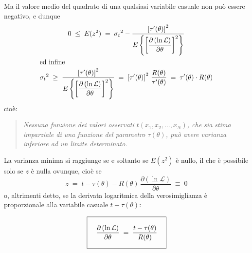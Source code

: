 Ma il valore medio del quadrato di una qualsiasi variabile
casuale non pu\`o essere negativo, e dunque
\begin{gather*}
  0 \; \le \;
    E(z^2) \; = \;
    {\sigma_t}^2 -
    \frac{ \left[ \tau ' (\theta) \right] ^2 }
    {E \left\{ \left[ \dfrac{\partial \left( \ln
    \mathcal{L} \right)}{\partial \theta} \right]
    ^2 \right\} } \\
  \intertext{ed infine}
  {\sigma_t}^2 \; \geq \;
    \frac{ \left[ \tau ' (\theta) \right] ^2 }
    {E \left\{ \left[ \dfrac{\partial \left( \ln
    \mathcal{L} \right)}{\partial \theta} \right]
    ^2 \right\} }
    \; = \; \left[ \tau ' (\theta) \right] ^2 \,
    \frac{R(\theta)}{\tau ' (\theta)}
    \; = \; \tau ' (\theta) \cdot R(\theta)
\end{gather*}
cio\`e:
\begin{quote}
  \textit{Nessuna funzione dei valori osservati
    $t(x_1,x_2,\ldots,x_N)$, che sia stima imparziale di una
    funzione del parametro $\tau(\theta)$, pu\`o avere
    varianza inferiore ad un limite determinato.}
\end{quote}

La varianza minima si raggiunge se e soltanto se $E(z^2)$
\`e nullo, il che \`e possibile solo se $z$ \`e nulla
ovunque, cio\`e se
\begin{equation*}
  z \; = \;
    t - \tau(\theta) - R(\theta) \,
    \frac{\partial \left( \ln \mathcal{L} \right)}
    {\partial \theta} \; \equiv \; 0
\end{equation*}
o, altrimenti detto, se la derivata logaritmica della
verosimiglianza \`e proporzionale alla variabile casuale $t
- \tau(\theta)$:

\begin{equation} \label{eq:e.condmin}
  \boxed{\rule[-6mm]{0mm}{14mm} \quad
    \frac{\partial \left( \ln \mathcal{L} \right)}
    {\partial \theta} \; = \;
    \frac{t - \tau(\theta)}
    {R(\theta)} \quad }
\end{equation}

